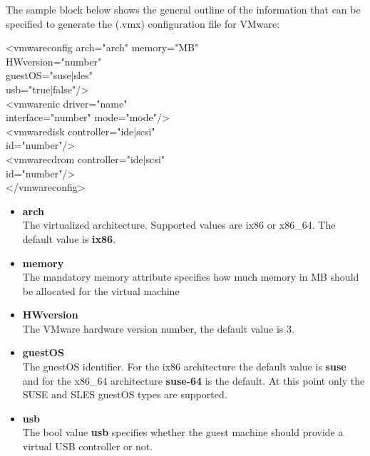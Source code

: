 \begin{itemize}
    The sample block below shows the general outline of the information
    that can be specified to generate the (.vmx) configuration file for
    VMware:

	\begin{Command}{12cm}
	<vmwareconfig arch="arch" memory="MB"\\
	\hspace*{2.5cm}HWversion="number"\\
	\hspace*{2.5cm}guestOS="suse|sles"\\
	\hspace*{2.5cm}usb="true|false"/>\\
	\hspace*{1cm}<vmwarenic driver="name"\\
	\hspace*{2.5cm}interface="number" mode="mode"/>\\
	\hspace*{1cm}<vmwaredisk controller="ide|scsi"\\
	\hspace*{2.5cm}id="number"/>\\
	\hspace*{1cm}<vmwarecdrom controller="ide|scsi"\\
	\hspace*{2.5cm}id="number"/>\\
	</vmwareconfig>
	\end{Command}

	\begin{itemize}
	\item \textbf{arch}\\
      The virtualized architecture. Supported values are ix86 or x86\_64.
      The default value is \textbf{ix86}.
	\item \textbf{memory}\\
      The mandatory memory attribute specifies how much memory in MB
      should be allocated for the virtual machine
	\item \textbf{HWversion}\\
      The VMware hardware version number, the default value is 3.
	\item \textbf{guestOS}\\
      The guestOS identifier. For the ix86 architecture the default 
      value is \textbf{suse} and for the x86\_64 architecture
      \textbf{suse-64} is the default. At this point only the SUSE and
      SLES guestOS types are supported.
	\item \textbf{usb}\\
      The bool value \textbf{usb} specifies whether the guest machine
      should provide a virtual USB controller or not.
	\end{itemize}


\end{itemize}
